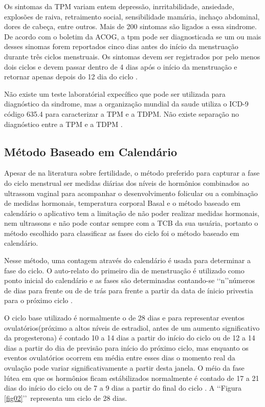 Os sintomas da TPM variam entem depressão, inrritabilidade, ansiedade, explosões de raiva, retraimento social, sensibilidade mamária, inchaço abdominal, dores de cabeça, entre outros. Mais de 200 sintomas são ligados a essa sindrome. De acordo com o boletim da ACOG, a tpm pode ser diagnosticada se um ou mais desses sinomas forem reportados cinco dias antes do início da menstruação durante três ciclos menstruais. Os sintomas devem ser registrados por pelo menos dois ciclos e devem passar dentro de 4 dias após o início da menstruação e retornar apenas depois do 12 dia do ciclo \cite{ACOG2000}.

Não existe um teste laboratórial expecífico que pode ser utilizada para diagnóstico da sindrome, mas a organização mundial da saude utiliza o ICD-9 código 635.4 para caracterizar a TPM e a TDPM. Não existe separação no diagnóstico entre a TPM e a TDPM \cite{biggs2011}.

\subsection{Método Baseado em Calendário}

Apesar de na literatura sobre fertilidade, o método preferido para capturar a fase do ciclo menstrual ser medidas diárias dos níveis de hormônios combinados ao ultrassom vaginal para acompanhar o desenvolvimento folicular \cite{ecochard2001} ou a combinação de medidas hormonais, temperatura corporal Basal e o método baseado em calendário \cite{becker2005} o aplicativo tem a limitação de não poder realizar medidas hormonais, nem ultrassons e não pode contar sempre com a TCB da sua usuária, portanto o método escolhido para classificar as fases do ciclo foi o método baseado em calendário.

Nesse método, uma contagem através do calendário é usada para determinar a fase do ciclo. O auto-relato do primeiro dia de menstruação é utilizado como ponto inicial do calendário e as fases são determinadas contando-se \lq \lq n\rq \rq  números de dias para frente ou de de trás para frente a partir da data de ínicio privestia para o próximo ciclo \cite{wideman2013}.

O ciclo base utilizado é normalmente o de 28 dias e para representar eventos ovulatórios(próximo a altos níveis de estradiol, antes de um aumento significativo da progesterona) é contado 10 a 14 dias a partir do início do ciclo ou de 12 a 14 dias a partir do dia de previsão para início do próximo ciclo, mas enquanto os eventos ovulatórios ocorrem em média entre esses dias o momento real da ovulação pode variar significativamente a partir desta janela. O méio da fase lútea em que os hormônios ficam estábilizados normalmente é contado de 17 a 21 dias do início do ciclo ou de 7 a 9 dias a partir do final do ciclo \cite{wideman2013}. A \lq\lq Figura \ref{fig02}\rq\rq\ representa um ciclo de 28 dias.


